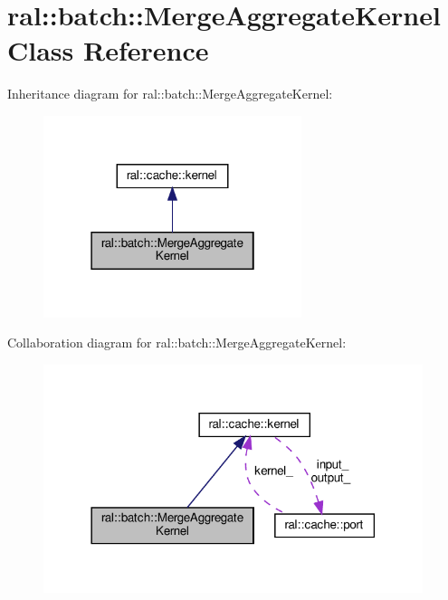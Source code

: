 \hypertarget{classral_1_1batch_1_1MergeAggregateKernel}{}\section{ral\+:\+:batch\+:\+:Merge\+Aggregate\+Kernel Class Reference}
\label{classral_1_1batch_1_1MergeAggregateKernel}


Inheritance diagram for ral\+:\+:batch\+:\+:Merge\+Aggregate\+Kernel\+:\nopagebreak
\begin{figure}[H]
\begin{center}
\leavevmode
\includegraphics[width=214pt]{classral_1_1batch_1_1MergeAggregateKernel__inherit__graph}
\end{center}
\end{figure}


Collaboration diagram for ral\+:\+:batch\+:\+:Merge\+Aggregate\+Kernel\+:\nopagebreak
\begin{figure}[H]
\begin{center}
\leavevmode
\includegraphics[width=314pt]{classral_1_1batch_1_1MergeAggregateKernel__coll__graph}
\end{center}
\end{figure}
